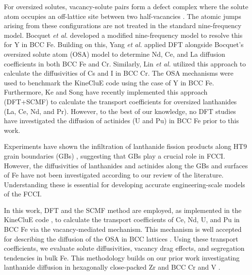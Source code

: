 \documentclass[preprint,12pt]{elsarticle}
\begin{document}
For oversized solutes, vacancy-solute pairs form a defect complex where the solute atom occupies an off-lattice site between two half-vacancies \cite{bocquet_migration_2017}. The atomic jumps 
arising from these configurations are not treated in the standard nine-frequency model.
Bocquet \textit{et al.} \cite{bocquet_migration_2017} developed a modified nine-frequency model \cite{leclaire1970} to resolve this for Y in BCC Fe. Building on this, Yang \textit{et al.} \cite{yang_significant_2023} applied DFT alongside Bocquet’s oversized solute atom (OSA) model to determine Nd, Ce, and La diffusion coefficients in both BCC Fe and Cr. Similarly, Lin \textit{et al.} \cite{lin2024first} utilized this approach to calculate the diffusivities of Cs and I in BCC Cr. The OSA mechanisms were used to benchmark the KineCluE code \cite{schuler_kineclue_2020} using the case of Y in BCC Fe. Furthermore, Ke and Song \cite{ke2025diffusion} have recently implemented this approach (DFT+SCMF) to calculate the transport coefficients for oversized lanthanides (La, Ce, Nd, and Pr). However, to the best of our knowledge, no DFT studies have investigated the diffusion of actinides (U and Pu) in BCC Fe prior to this work.

Experiments have shown the infiltration of lanthanide fission products along HT9 grain boundaries (GBs) \cite{wang2022small, wang2024transmission}, suggesting that GBs play a crucial role in FCCI. However, the diffusivities of lanthanides and actinides along the GBs and surfaces of Fe have not been investigated according to our review of the literature. Understanding these is essential for developing accurate engineering-scale models of the FCCI.

In this work, DFT and the SCMF method are employed, as implemented in the KineCluE code \cite{schuler_kineclue_2020}, to calculate the transport coefficients of Ce, Nd, U, and Pu in BCC Fe via the vacancy-mediated mechanism. This mechanism is well accepted for describing the diffusion of the OSA in BCC lattices \cite{ bocquet_migration_2017,yang_significant_2023}. Using these transport coefficients, we evaluate solute diffusivities, vacancy drag effects, and segregation tendencies in bulk Fe. This methodology builds on our prior work investigating lanthanide diffusion in hexagonally close-packed Zr \cite{shousha2024first} and BCC Cr and V \cite{shousha_cr}. 
\end{document}
